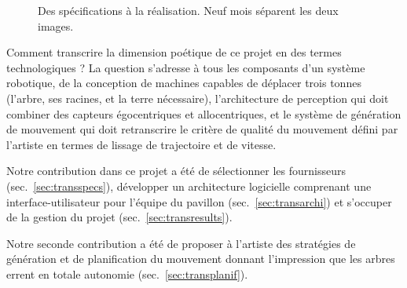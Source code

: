 \documentclass[french,A4paper,]{book}
\begin{document}
\begin{figure}
\centering

\hspace*{\fill}
 \hfill%
\hspace*{\fill}

\caption{Des spécifications à la réalisation. Neuf mois séparent les
deux images.}

\label{fig:transhumusintro}

\end{figure}

Comment transcrire la dimension poétique de ce projet en des termes
technologiques ? La question s'adresse à tous les composants d'un
système robotique, de la conception de machines capables de déplacer
trois tonnes (l'arbre, ses racines, et la terre nécessaire),
l'architecture de perception qui doit combiner des capteurs
égocentriques et allocentriques, et le système de génération de
mouvement qui doit retranscrire le critère de qualité du mouvement
défini par l'artiste en termes de lissage de trajectoire et de vitesse.

Notre contribution dans ce projet a été de sélectionner les fournisseurs
(sec.~\ref{sec:transspecs}), développer un architecture logicielle
comprenant une interface-utilisateur pour l'équipe du pavillon
(sec.~\ref{sec:transarchi}) et s'occuper de la gestion du projet
(sec.~\ref{sec:transresults}).

Notre seconde contribution a été de proposer à l'artiste des stratégies
de génération et de planification du mouvement donnant l'impression que
les arbres errent en totale autonomie (sec.~\ref{sec:transplanif}).
\end{document}
